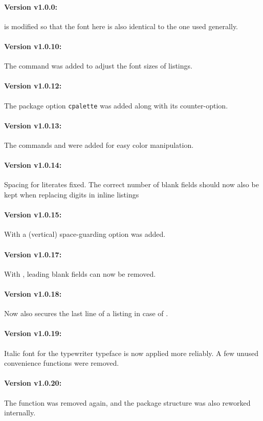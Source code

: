 \documentclass{sopra-base}
\begin{document}
\paragraph{Version v1.0.0:}  is modified so that the  font here is also identical to the one used generally.
\paragraph{Version v1.0.10:} The command  was added to
adjust the font sizes of listings.
\paragraph{Version v1.0.12:} The package option \texttt{cpalette} was added along with its counter-option.
\paragraph{Version v1.0.13:} The commands  and  were added for easy color manipulation.
\paragraph{Version v1.0.14:} Spacing for literates fixed. The correct number of blank fields should now also be kept when replacing digits in inline listings
\paragraph{Version v1.0.15:} With  a (vertical) space-guarding option was added.
\paragraph{Version v1.0.17:} With , leading blank fields can now be removed.
\paragraph{Version v1.0.18:}
Now also secures the last line of a listing in case of .
\paragraph{Version v1.0.19:}
Italic font for the typewriter typeface is now applied more reliably. A few unused convenience functions were removed.
\paragraph{Version v1.0.20:}
The  function was removed again, and the package structure was also reworked internally.
\end{document}
